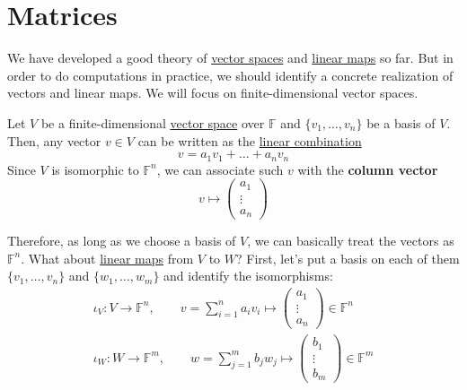 \section{Matrices}
	
	We have developed a good theory of \hyperref[def:vector-space]{vector spaces} and \hyperref[def:linear_map]{linear maps} so far. But in order to do computations in practice, we should identify a concrete realization of vectors and linear maps. We will focus on finite-dimensional vector spaces. 

	\begin{definition}
	  \label{def:column-vector}
		Let $V$ be a finite-dimensional \hyperref[def:vector-space]{vector space} over $\mathbb{F}$ and $\{v_1, \ldots, v_n\}$ be a basis of $V$. Then, any vector $v \in V$ can be written as the \hyperref[def:linear-combination]{linear combination} 
		\begin{equation}
		  v = a_1 v_1 + \ldots + a_n v_n
		\end{equation}
		Since $V$ is isomorphic to $\mathbb{F}^n$, we can associate such $v$ with the \textbf{column vector}
		\begin{equation}
			v \mapsto \begin{pmatrix} a_1 \\ \vdots \\ a_n \end{pmatrix}
		\end{equation}
	\end{definition} 

	Therefore, as long as we choose a basis of $V$, we can basically treat the vectors as $\mathbb{F}^n$. What about \hyperref[def:linear_map]{linear maps} from $V$ to $W$? First, let's put a basis on each of them $\{v_1, \ldots, v_n\}$ and $\{w_1, \ldots, w_m\}$ and identify the isomorphisms: 
	\begin{align}
		\iota_V : V \to \mathbb{F}^n, \qquad v = \sum_{i=1}^n a_i v_i \mapsto \begin{pmatrix} a_1 \\ \vdots \\ a_n \end{pmatrix} \in \mathbb{F}^n \\
		\iota_W : W \to \mathbb{F}^m, \qquad w = \sum_{j=1}^m b_j w_j \mapsto \begin{pmatrix} b_1 \\ \vdots \\ b_m \end{pmatrix} \in \mathbb{F}^m
	\end{align}

